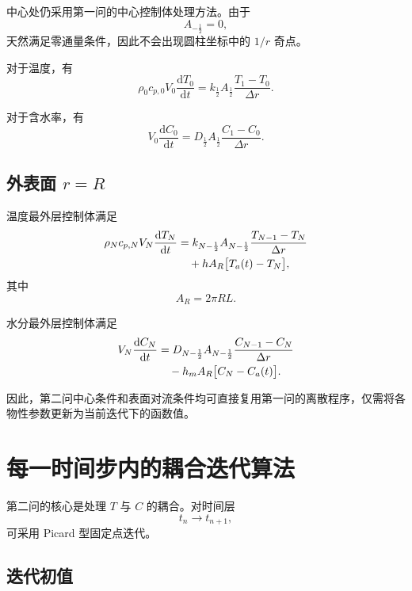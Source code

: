 \documentclass[UTF8,a4paper,12pt]{ctexart}
\begin{document}
中心处仍采用第一问的中心控制体处理方法。由于
\begin{equation}
    A_{-\frac12}=0,
\end{equation}
天然满足零通量条件，因此不会出现圆柱坐标中的 $1/r$ 奇点。

对于温度，有
\begin{equation}
    \rho_0c_{p,0}V_0
    \frac{\mathrm{d}T_0}{\mathrm{d}t}
    =
    k_{\frac12}A_{\frac12}
    \frac{T_1-T_0}{\Delta r}.
\end{equation}

对于含水率，有
\begin{equation}
    V_0
    \frac{\mathrm{d}C_0}{\mathrm{d}t}
    =
    D_{\frac12}A_{\frac12}
    \frac{C_1-C_0}{\Delta r}.
\end{equation}

\subsection{外表面 $r=R$}

温度最外层控制体满足
\begin{align}
    \rho_Nc_{p,N}V_N\frac{\mathrm{d}T_N}{\mathrm{d}t}
    &=
    k_{N-\frac12}A_{N-\frac12}
    \frac{T_{N-1}-T_N}{\Delta r}
    \notag\\
    &\quad+
    hA_R\bigl[T_a(t)-T_N\bigr],
    \label{eq:heat-surface-fvm}
\end{align}
其中
\begin{equation}
    A_R=2\pi RL.
\end{equation}

水分最外层控制体满足
\begin{align}
    V_N\frac{\mathrm{d}C_N}{\mathrm{d}t}
    &=
    D_{N-\frac12}A_{N-\frac12}
    \frac{C_{N-1}-C_N}{\Delta r}
    \notag\\
    &\quad-
    h_mA_R\bigl[C_N-C_a(t)\bigr].
    \label{eq:moisture-surface-fvm}
\end{align}

因此，第二问中心条件和表面对流条件均可直接复用第一问的离散程序，仅需将各物性参数更新为当前迭代下的函数值。

\section{每一时间步内的耦合迭代算法}

第二问的核心是处理 $T$ 与 $C$ 的耦合。对时间层
\[
t_n\longrightarrow t_{n+1},
\]
可采用 Picard 型固定点迭代。

\subsection{迭代初值}
\end{document}
